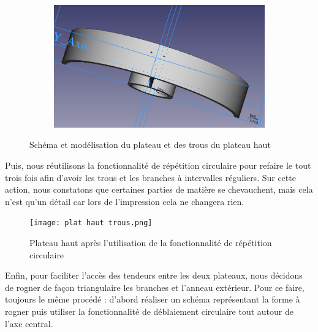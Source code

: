 \documentclass[a4paper,12pt]{article}
\begin{document}
\begin{figure}[H]
\begin{subfigure}[]{0.3\textwidth}
    \end{subfigure}
    \begin{subfigure}[]{0.3\textwidth}
        \includegraphics[width=\textwidth]{demi plat haut final.png}
    \end{subfigure}
    \caption{Schéma et modélisation du plateau et des trous du plateau haut}
\end{figure}

Puis, nous réutilisons la fonctionnalité de répétition circulaire pour refaire le tout trois fois afin d’avoir les trous et les branches à intervalles réguliers. Sur cette action, nous constatons que certaines parties de matière se chevauchent, mais cela n’est qu’un détail car lors de l’impression cela ne changera rien. 

\begin{figure}[H]
    \centering
    \texttt{[image: plat haut trous.png]}
    \caption{Plateau haut après l'utilisation de la fonctionnalité de répétition circulaire}
\end{figure}

Enfin, pour faciliter l’accès des tendeurs entre les deux plateaux, nous décidons de rogner de façon triangulaire les branches et l’anneau extérieur. Pour ce faire, toujours le même procédé : d’abord réaliser un schéma représentant la forme à rogner puis utiliser la fonctionnalité de déblaiement circulaire tout autour de l’axe central.
\end{document}
